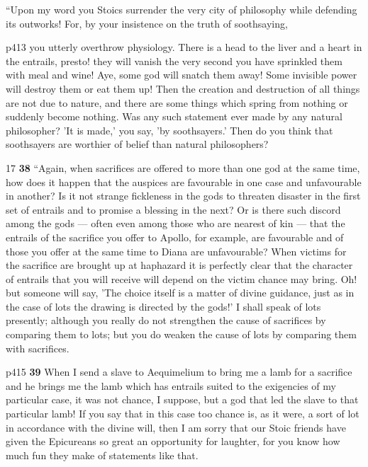 ``Upon my word you Stoics surrender the very city of philosophy while defending its outworks! For, by your insistence on the truth of soothsaying,

p413 you utterly overthrow physiology. There is a head to the liver and a heart in the entrails, presto! they will vanish the very second you have sprinkled them with meal and wine! Aye, some god will snatch them away! Some invisible power will destroy them or eat them up! Then the creation and destruction of all things are not due to nature, and there are some things which spring from nothing or suddenly become nothing. Was any such statement ever made by any natural philosopher? 'It is made,' you say, 'by soothsayers.' Then do you think that soothsayers are worthier of belief than natural philosophers?

17
\textbf{38} ``Again, when sacrifices are offered to more than one god at the same time, how does it happen that the auspices are favourable in one case and unfavourable in another? Is it not strange fickleness in the gods to threaten disaster in the first set of entrails and to promise a blessing in the next? Or is there such discord among the gods \texthebrew{—} often even among those who are nearest of kin \texthebrew{—} that the entrails of the sacrifice you offer to Apollo, for example, are favourable and of those you offer at the same time to Diana are unfavourable? When victims for the sacrifice are brought up at haphazard it is perfectly clear that the character of entrails that you will receive will depend on the victim chance may bring. Oh! but someone will say, 'The choice itself is a matter of divine guidance, just as in the case of lots the drawing is directed by the gods!' I shall speak of lots presently; although you really do not strengthen the cause of sacrifices by comparing them to lots; but you do weaken the cause of lots by comparing them with sacrifices.

p415 \textbf{39} When I send a slave to Aequimelium to bring me a lamb for a sacrifice and he brings me the lamb which has entrails suited to the exigencies of my particular case, it was not chance, I suppose, but a god that led the slave to that particular lamb! If you say that in this case too chance is, as it were, a sort of lot in accordance with the divine will, then I am sorry that our Stoic friends have given the Epicureans so great an opportunity for laughter, for you know how much fun they make of statements like that.


